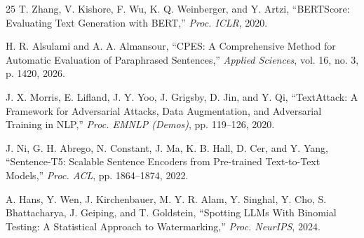 \documentclass[conference,onecolumn,11pt]{IEEEtran}
\begin{document}
\begin{thebibliography}{25}
T. Zhang, V. Kishore, F. Wu, K. Q. Weinberger, and Y. Artzi, ``BERTScore: Evaluating Text Generation with BERT,'' \textit{Proc. ICLR}, 2020.

H. R. Alsulami and A. A. Almansour, ``CPES: A Comprehensive Method for Automatic Evaluation of Paraphrased Sentences,'' \textit{Applied Sciences}, vol. 16, no. 3, p. 1420, 2026.

J. X. Morris, E. Lifland, J. Y. Yoo, J. Grigsby, D. Jin, and Y. Qi, ``TextAttack: A Framework for Adversarial Attacks, Data Augmentation, and Adversarial Training in NLP,'' \textit{Proc. EMNLP (Demos)}, pp. 119--126, 2020.

J. Ni, G. H. Abrego, N. Constant, J. Ma, K. B. Hall, D. Cer, and Y. Yang, ``Sentence-T5: Scalable Sentence Encoders from Pre-trained Text-to-Text Models,'' \textit{Proc. ACL}, pp. 1864--1874, 2022.

A. Hans, Y. Wen, J. Kirchenbauer, M. Y. R. Alam, Y. Singhal, Y. Cho, S. Bhattacharya, J. Geiping, and T. Goldstein, ``Spotting LLMs With Binomial Testing: A Statistical Approach to Watermarking,'' \textit{Proc. NeurIPS}, 2024.

\end{thebibliography}
\end{document}
